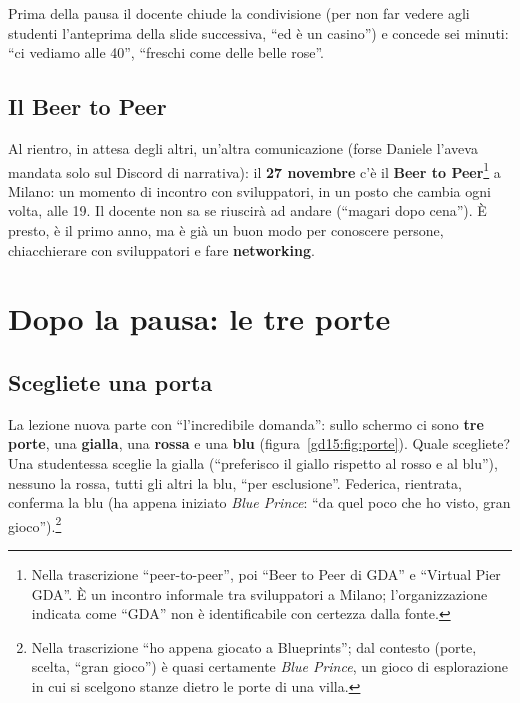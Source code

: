 Prima della pausa il docente chiude la condivisione (per non far vedere agli
studenti l'anteprima della slide successiva, ``ed è un casino'') e concede
sei minuti: ``ci vediamo alle 40'', ``freschi come delle belle rose''.

\subsection{Il Beer to Peer}

Al rientro, in attesa degli altri, un'altra comunicazione (forse Daniele
l'aveva mandata solo sul Discord di narrativa): il \textbf{27 novembre} c'è
il \textbf{Beer to Peer}\footnote{Nella trascrizione ``peer-to-peer'', poi
``Beer to Peer di GDA'' e ``Virtual Pier GDA''. È un incontro informale tra
sviluppatori a Milano; l'organizzazione indicata come ``GDA'' non è
identificabile con certezza dalla fonte.} a Milano: un momento di incontro
con sviluppatori, in un posto che cambia ogni volta, alle 19. Il docente non
sa se riuscirà ad andare (``magari dopo cena''). È presto, è il primo anno,
ma è già un buon modo per conoscere persone, chiacchierare con sviluppatori
e fare \textbf{networking}.

\section{Dopo la pausa: le tre porte}
\label{gd15:sec:porte}



\subsection{Scegliete una porta}

La lezione nuova parte con ``l'incredibile domanda'': sullo schermo ci sono
\textbf{tre porte}, una \textbf{gialla}, una \textbf{rossa} e una
\textbf{blu} (figura~\ref{gd15:fig:porte}). Quale scegliete? Una studentessa
sceglie la gialla (``preferisco il giallo rispetto al rosso e al blu''),
nessuno la rossa, tutti gli altri la blu, ``per esclusione''. Federica,
rientrata, conferma la blu (ha appena iniziato \emph{Blue Prince}:
``da quel poco che ho visto, gran gioco'').\footnote{Nella trascrizione
``ho appena giocato a Blueprints''; dal contesto (porte, scelta, ``gran
gioco'') è quasi certamente \emph{Blue Prince}, un gioco di esplorazione in
cui si scelgono stanze dietro le porte di una villa.}


